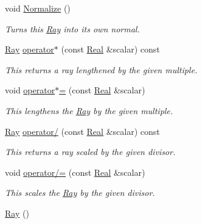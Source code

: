 \begin{DoxyCompactItemize}
void \hyperlink{classMezzanine_1_1Ray_a0f0605e55999112a5f1ae0e3a842593d}{Normalize} ()
\begin{DoxyCompactList}\small\item\em Turns this \hyperlink{classMezzanine_1_1Ray}{Ray} into its own normal. \item\end{DoxyCompactList}\item 
\hyperlink{classMezzanine_1_1Ray}{Ray} \hyperlink{classMezzanine_1_1Ray_a55c32bfa8ee017b3730c1a25aeb2a168}{operator$\ast$} (const \hyperlink{namespaceMezzanine_a726731b1a7df72bf3583e4a97282c6f6}{Real} \&scalar) const 
\begin{DoxyCompactList}\small\item\em This returns a ray lengthened by the given multiple. \item\end{DoxyCompactList}\item 
void \hyperlink{classMezzanine_1_1Ray_aae46f14a24ddbf11e841f73121e513b7}{operator$\ast$=} (const \hyperlink{namespaceMezzanine_a726731b1a7df72bf3583e4a97282c6f6}{Real} \&scalar)
\begin{DoxyCompactList}\small\item\em This lengthens the \hyperlink{classMezzanine_1_1Ray}{Ray} by the given multiple. \item\end{DoxyCompactList}\item 
\hyperlink{classMezzanine_1_1Ray}{Ray} \hyperlink{classMezzanine_1_1Ray_a6ebf84f9c9e6d77a3155ed04be4ac71e}{operator/} (const \hyperlink{namespaceMezzanine_a726731b1a7df72bf3583e4a97282c6f6}{Real} \&scalar) const 
\begin{DoxyCompactList}\small\item\em This returns a ray scaled by the given divisor. \item\end{DoxyCompactList}\item 
void \hyperlink{classMezzanine_1_1Ray_a4b66bd341d7f5e2bfc86cca7f2d665b9}{operator/=} (const \hyperlink{namespaceMezzanine_a726731b1a7df72bf3583e4a97282c6f6}{Real} \&scalar)
\begin{DoxyCompactList}\small\item\em This scales the \hyperlink{classMezzanine_1_1Ray}{Ray} by the given divisor. \item\end{DoxyCompactList}\item 
\hyperlink{classMezzanine_1_1Ray_ad189f8e1e9a28bb50c1da50d24e988b4}{Ray} ()

\end{DoxyCompactItemize}
